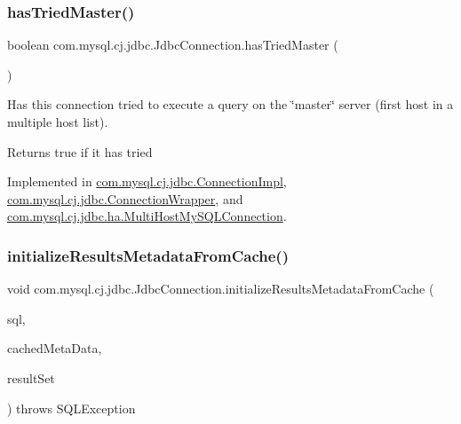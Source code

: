 \subsubsection{\texorpdfstring{has\+Tried\+Master()}{hasTriedMaster()}}
{\footnotesize\ttfamily boolean com.\+mysql.\+cj.\+jdbc.\+Jdbc\+Connection.\+has\+Tried\+Master (\begin{DoxyParamCaption}{ }\end{DoxyParamCaption})}

Has this connection tried to execute a query on the \char`\"{}master\char`\"{} server (first host in a multiple host list).

\begin{DoxyReturn}{Returns}
true if it has tried 
\end{DoxyReturn}


Implemented in \mbox{\hyperlink{classcom_1_1mysql_1_1cj_1_1jdbc_1_1_connection_impl_acc9cbd5c4e0570757e05993e123c5696}{com.\+mysql.\+cj.\+jdbc.\+Connection\+Impl}}, \mbox{\hyperlink{classcom_1_1mysql_1_1cj_1_1jdbc_1_1_connection_wrapper_a38b81e539492d555536e40cc39bca55b}{com.\+mysql.\+cj.\+jdbc.\+Connection\+Wrapper}}, and \mbox{\hyperlink{classcom_1_1mysql_1_1cj_1_1jdbc_1_1ha_1_1_multi_host_my_s_q_l_connection_a2eb48d606b888ae970ca17640c54b082}{com.\+mysql.\+cj.\+jdbc.\+ha.\+Multi\+Host\+My\+S\+Q\+L\+Connection}}.

\mbox{\label{interfacecom_1_1mysql_1_1cj_1_1jdbc_1_1_jdbc_connection_adaeb33edd797d27f3836f5cab30c51d0}} 
\subsubsection{\texorpdfstring{initialize\+Results\+Metadata\+From\+Cache()}{initializeResultsMetadataFromCache()}}
{\footnotesize\ttfamily void com.\+mysql.\+cj.\+jdbc.\+Jdbc\+Connection.\+initialize\+Results\+Metadata\+From\+Cache (\begin{DoxyParamCaption}\item[{String}]{sql,  }\item[{\mbox{\hyperlink{interfacecom_1_1mysql_1_1cj_1_1jdbc_1_1result_1_1_cached_result_set_meta_data}{Cached\+Result\+Set\+Meta\+Data}}}]{cached\+Meta\+Data,  }\item[{\mbox{\hyperlink{interfacecom_1_1mysql_1_1cj_1_1jdbc_1_1result_1_1_result_set_internal_methods}{Result\+Set\+Internal\+Methods}}}]{result\+Set }\end{DoxyParamCaption}) throws S\+Q\+L\+Exception}



